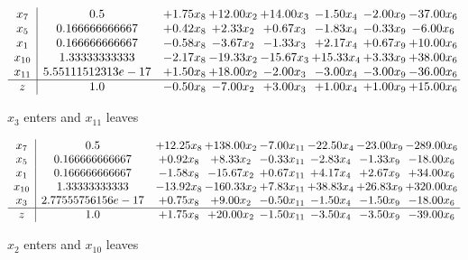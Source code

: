 \documentclass[8pt]{article}
\begin{document}
 \[\begin{array}{c| c c@{\hskip 2pt} c@{\hskip 2pt} c@{\hskip 2pt} c@{\hskip 2pt} c@{\hskip 2pt} c@{\hskip 2pt} }
 x_{7}   &  0.5 & +  1.75 x_{8} & + 12.00 x_{2} & + 14.00 x_{3} & -1.50 x_{4} & -2.00 x_{9} & -37.00 x_{6}\\
 x_{5}   &  0.166666666667 & +  0.42 x_{8} & +  2.33 x_{2} & +  0.67 x_{3} & -1.83 x_{4} & -0.33 x_{9} & -6.00 x_{6}\\
 x_{1}   &  0.166666666667 & -0.58 x_{8} & -3.67 x_{2} & -1.33 x_{3} & +  2.17 x_{4} & +  0.67 x_{9} & + 10.00 x_{6}\\
 x_{10}   &  1.33333333333 & -2.17 x_{8} & -19.33 x_{2} & -15.67 x_{3} & + 15.33 x_{4} & +  3.33 x_{9} & + 38.00 x_{6}\\
 x_{11}   &  5.55111512313e-17 & +  1.50 x_{8} & + 18.00 x_{2} & -2.00 x_{3} & -3.00 x_{4} & -3.00 x_{9} & -36.00 x_{6}\\
\hline
z    &  1.0 & -0.50 x_{8} & -7.00 x_{2} & +  3.00 x_{3} & +  1.00 x_{4} & +  1.00 x_{9} & + 15.00 x_{6}\\
\end{array}\]


 $ x_{3} $ enters and $ x_{11} $ leaves 

 \[\begin{array}{c| c c@{\hskip 2pt} c@{\hskip 2pt} c@{\hskip 2pt} c@{\hskip 2pt} c@{\hskip 2pt} c@{\hskip 2pt} }
 x_{7}   &  0.5 & + 12.25 x_{8} & + 138.00 x_{2} & -7.00 x_{11} & -22.50 x_{4} & -23.00 x_{9} & -289.00 x_{6}\\
 x_{5}   &  0.166666666667 & +  0.92 x_{8} & +  8.33 x_{2} & -0.33 x_{11} & -2.83 x_{4} & -1.33 x_{9} & -18.00 x_{6}\\
 x_{1}   &  0.166666666667 & -1.58 x_{8} & -15.67 x_{2} & +  0.67 x_{11} & +  4.17 x_{4} & +  2.67 x_{9} & + 34.00 x_{6}\\
 x_{10}   &  1.33333333333 & -13.92 x_{8} & -160.33 x_{2} & +  7.83 x_{11} & + 38.83 x_{4} & + 26.83 x_{9} & + 320.00 x_{6}\\
 x_{3}   &  2.77555756156e-17 & +  0.75 x_{8} & +  9.00 x_{2} & -0.50 x_{11} & -1.50 x_{4} & -1.50 x_{9} & -18.00 x_{6}\\
\hline
z    &  1.0 & +  1.75 x_{8} & + 20.00 x_{2} & -1.50 x_{11} & -3.50 x_{4} & -3.50 x_{9} & -39.00 x_{6}\\
\end{array}\]


 $ x_{2} $ enters and $ x_{10} $ leaves 
\end{document}

